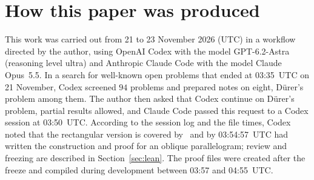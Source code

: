 \documentclass[11pt]{article}
\theoremstyle{definition}
\theoremstyle{remark}
\begin{document}
\section*{How this paper was produced}
This work was carried out from 21 to 23 November 2026 (UTC) in a workflow
directed by the author, using OpenAI Codex with the model GPT-6.2-Astra
(reasoning level ultra) and Anthropic Claude Code with the model Claude
Opus~5.5. In a search for well-known open problems that ended at 03:35~UTC on
21 November, Codex screened $94$ problems and prepared notes on eight,
D\"urer's problem among them. The author then asked that Codex continue on
D\"urer's problem, partial results allowed, and Claude Code passed this
request to a Codex session at 03:50~UTC. According to the session log and the
file times, Codex noted that the rectangular version is covered
by~\cite{oro22} and by 03:54:57~UTC had written the construction and proof
for an oblique parallelogram; review and freezing are described in
Section~\ref{sec:lean}. The proof files were created after the freeze and
compiled during development between 03:57 and 04:55~UTC.
\end{document}
